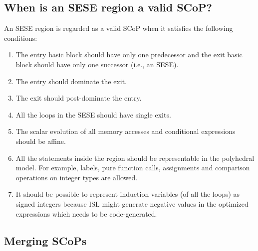 \documentclass{sig-alternate}
\begin{document}
\subsection{When is an SESE region a valid SCoP?}
\label{subsec:validity}
An SESE region is regarded as a valid SCoP when it satisfies the following
conditions:
\begin{enumerate}
\item The entry basic block should have only one predecessor and the exit
  basic block should have only one successor (i.e., an SESE).
\item The entry should dominate the exit.
\item The exit should post-dominate the entry.
\item All the loops in the SESE should have single exits.
\item The scalar evolution of all memory accesses and conditional expressions
  should be affine.
\item All the statements inside the region should be representable in the
  polyhedral model.  For example, labels, pure function calls, assignments and
  comparison operations on integer types are allowed.
\item It should be possible to represent induction variables (of all the loops)
  as signed integers because ISL might generate negative values in the optimized
  expressions which needs to be code-generated.
\end{enumerate}

\subsection{Merging SCoPs}
\label{subsec:merge-sese}
\end{document}
